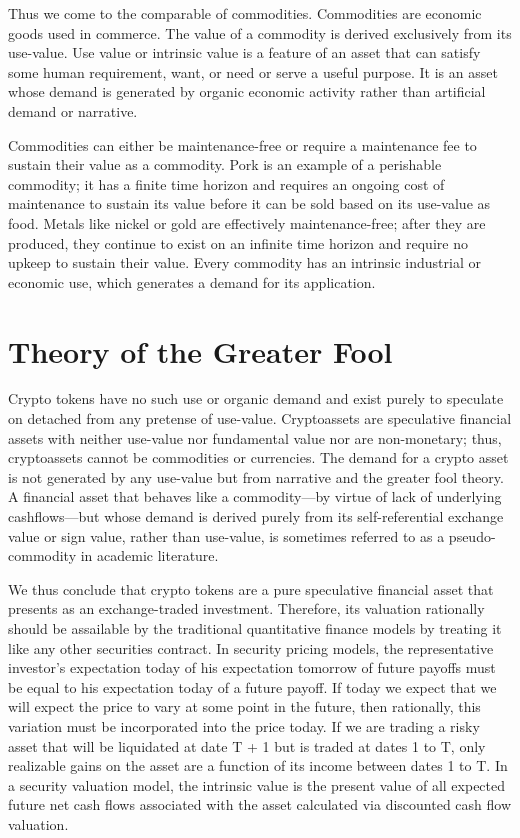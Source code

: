 
Thus we come to the comparable of commodities. Commodities are economic goods
used in commerce. The value of a commodity is derived exclusively from its
use-value. Use value or intrinsic value is a feature of an asset that can
satisfy some human requirement, want, or need or serve a useful purpose. It is
an asset whose demand is generated by organic economic activity rather than
artificial demand or narrative.


Commodities can either be maintenance-free or require a maintenance fee to
sustain their value as a commodity. Pork is an example of a perishable
commodity; it has a finite time horizon and requires an ongoing cost of
maintenance to sustain its value before it can be sold based on its use-value as
food. Metals like nickel or gold are effectively maintenance-free; after they
are produced, they continue to exist on an infinite time horizon and require no
upkeep to sustain their value. Every commodity has an intrinsic industrial or
economic use, which generates a demand for its application.


\section{Theory of the Greater Fool}

Crypto tokens have no such use or organic demand and exist purely to speculate
on detached from any pretense of use-value. Cryptoassets are speculative
financial assets with neither use-value nor fundamental value nor are
non-monetary; thus, cryptoassets cannot be commodities or currencies. The demand
for a crypto asset is not generated by any use-value but from narrative and the
greater fool theory. A financial asset that behaves like a commodity—by virtue
of lack of underlying cashflows—but whose demand is derived purely from its
self-referential exchange value or sign value, rather than use-value, is
sometimes referred to as a pseudo-commodity in academic literature.


We thus conclude that crypto tokens are a pure speculative financial asset that
presents as an exchange-traded investment. Therefore, its valuation rationally
should be assailable by the traditional quantitative finance models by treating
it like any other securities contract. In security pricing models, the
representative investor's expectation today of his expectation tomorrow of
future payoffs must be equal to his expectation today of a future payoff. If
today we expect that we will expect the price to vary at some point in the
future, then rationally, this variation must be incorporated into the price
today. If we are trading a risky asset that will be liquidated at date T + 1 but
is traded at dates 1 to T, only realizable gains on the asset are a function of
its income between dates 1 to T. In a security valuation model, the intrinsic
value is the present value of all expected future net cash flows associated with
the asset calculated via discounted cash flow valuation.

